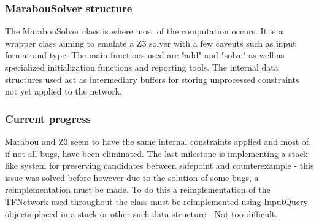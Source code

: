 \documentclass[a4paper,parskip=half]{scrartcl}
\begin{document}
\subsubsection{MarabouSolver structure}

The MarabouSolver class is where most of the computation occurs. It is a wrapper class aiming to emulate a Z3 solver with a few caveuts such as input format and type. The main functions used are "add" and "solve" as well as specialized initialization functions and reporting tools. The internal data structures used act as intermediary buffers for storing unprocessed constraints not yet applied to the network. 

\subsubsection{Current progress}

Marabou and Z3 seem to have the same internal constraints applied and most of, if not all bugs, have been eliminated. The last milestone is implementing a stack like system for preserving candidates between safepoint and counterexample - this issue was solved before however due to the solution of some bugs, a reimplementation must be made. To do this a reimplementation of the TFNetwork used throughout the class must be reimplemented using InputQuery objects placed in a stack or other such data structure - Not too difficult.
\end{document}
